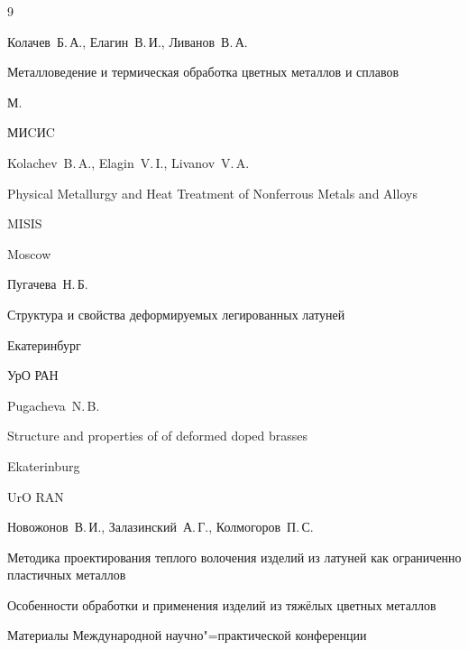 \begin{thebibliography}{9}




\by Колачев~Б.\,А., Елагин~В.\,И., Ливанов~В.\,А.

\book Металловедение и термическая обработка цветных металлов и сплавов

\publaddr М.

\publ МИCИC



\misctransl

\by Kolachev~B.\,A., Elagin~V.\,I., Livanov~V.\,A.

\book Physical Metallurgy and Heat Treatment of Nonferrous Metals and Alloys 

\publ MISIS

\publaddr Moscow








\by Пугачева~Н.\,Б.

\book Структура и свойства деформируемых легированных латуней

\publaddr Екатеринбург

\publ УрО РАН



\misctransl

\by Pugacheva~N.\,B.

\book Structure and properties of of deformed doped brasses

\publaddr Ekaterinburg

\publ UrO RAN






\by Новожонов~В.\,И., Залазинский~А.\,Г., Колмогоров~П.\,С.

\paper Методика проектирования теплого волочения изделий из латуней как ограниченно пластичных металлов

\inbook Особенности обработки и применения изделий из тяжёлых цветных металлов

\bookinfo Материалы Международной научно"=практической конференции


\end{thebibliography}
